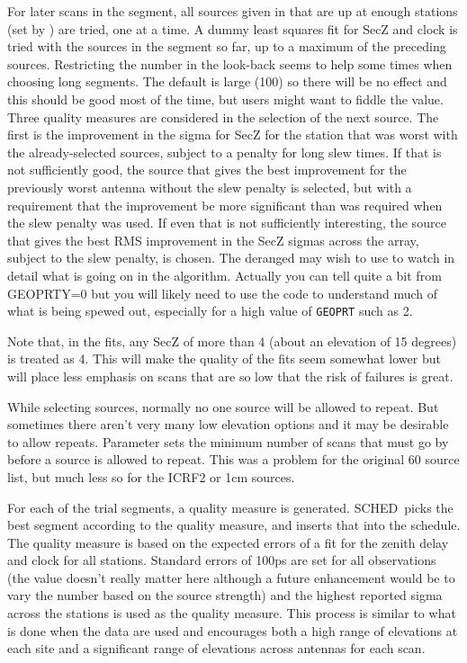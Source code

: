 \documentclass{report}
\newcommand{\schedb}{{\sc SCHED~}}
\begin{document}
For later scans in the segment, all sources given in  that are up at enough stations (set by
) are tried, one at a time.  A
dummy least squares fit for SecZ and clock is tried with the sources
in the segment so far, up to a maximum of the preceding  sources.  Restricting the number in the
look-back seems to help some times when choosing long segments.  The
default is large (100) so there will be no effect and this should be
good most of the time, but users might want to fiddle the value.
Three quality measures are considered in the selection of the next
source.  The first is the improvement in the sigma for SecZ for the
station that was worst with the already-selected sources, subject to a
penalty for long slew times.  If that is not sufficiently good, the
source that gives the best improvement for the previously worst
antenna without the slew penalty is selected, but with a requirement
that the improvement be more significant than was required when the
slew penalty was used.  If even that is not sufficiently interesting,
the source that gives the best RMS improvement in the SecZ sigmas
across the array, subject to the slew penalty, is chosen.  The
deranged may wish to use  to watch in
detail what is going on in the algorithm.  Actually you can tell quite
a bit from {GEOPRTY=0} but you will likely need to use the code to
understand much of what is being spewed out, especially for a high
value of {\tt GEOPRT} such as 2.

Note that, in the fits, any SecZ of more than 4 (about an elevation of
15 degrees) is treated as 4.  This will make the quality of the fits
seem somewhat lower but will place less emphasis on scans that are so
low that the risk of failures is great.

While selecting sources, normally no one source will be allowed to
repeat.  But sometimes there aren't very many low elevation options
and it may be desirable to allow repeats.  Parameter  sets the minimum number of scans that must go by
before a source is allowed to repeat.  This was a problem for the
original 60 source list, but much less so for the ICRF2 or 1cm sources.

For each of the  trial segments,
a quality measure is generated.  \schedb picks the best segment
according to the quality measure, and inserts that into the schedule.
The quality measure is based on the expected errors of a fit for the
zenith delay and clock for all stations.  Standard errors of 100ps are
set for all observations (the value doesn't really matter here
although a future enhancement would be to vary the number based on the
source strength) and the highest reported sigma across the stations is
used as the quality measure.  This process is similar to what is done
when the data are used and encourages both a high range of elevations
at each site and a significant range of elevations across antennas for
each scan.
\end{document}
